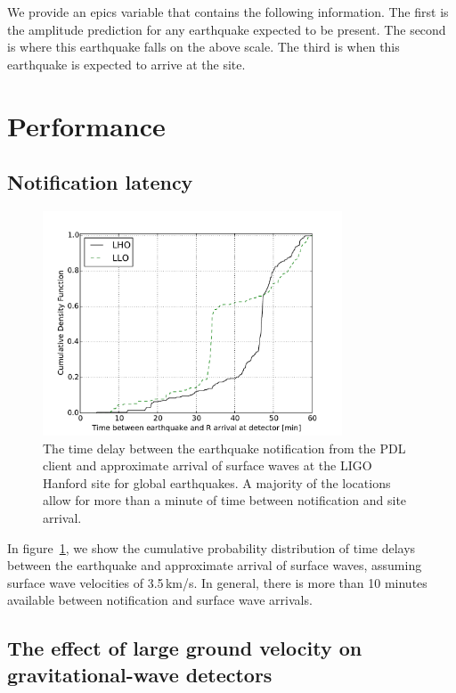 \documentclass[reprint, prl, aps, showpacs]{revtex4-1}
\begin{document}
We provide an epics variable that contains the following information.
The first is the amplitude prediction for any earthquake expected to be present.
The second is where this earthquake falls on the above scale.
The third is when this earthquake is expected to arrive at the site.

\section{Performance}
\label{sec:performance}

\subsection{Notification latency}

\begin{figure}[t]
\hspace*{-0.5cm}
 \includegraphics[width=3.5in]{delaysCDF.pdf}
 \caption{The time delay between the earthquake notification from the PDL client and approximate arrival of surface waves at the LIGO Hanford site for global earthquakes. A majority of the locations allow for more than a minute of time between notification and site arrival.}
 \label{fig:delays}
\end{figure}

In figure~\ref{fig:delays}, we show the cumulative probability distribution of time delays between the earthquake and approximate arrival of surface waves, assuming surface wave velocities of 3.5\,km/s. 
In general, there is more than 10 minutes available between notification and surface wave arrivals.

\subsection{The effect of large ground velocity on gravitational-wave detectors}
\end{document}
